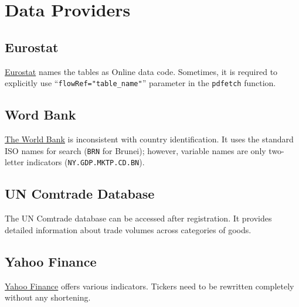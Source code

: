 \documentclass[10pt,a4paper]{article}
\begin{document}
\section*{Data Providers}
\subsection*{Eurostat}

\href{https://ec.europa.eu/eurostat/data/database}{\textcolor{NavyBlue}{Eurostat}} names the tables as Online data code. Sometimes, it is required to explicitly use \enquote{\texttt{flowRef="table\_name"}} parameter in the \texttt{pdfetch} function.

\begin{figure}[!htbp]\centering
\end{figure}

\subsection*{Word Bank}
\begin{figure}[!htbp]\centering
\end{figure}

\href{https://data.worldbank.org/}{\textcolor{NavyBlue}{The World Bank}} is inconsistent with country identification. It uses the standard ISO names for search (\texttt{BRN} for Brunei); however, variable names are only two-letter indicators (\texttt{NY.GDP.MKTP.CD.BN}).

\subsection*{UN Comtrade Database}
The UN Comtrade database can be accessed after registration. It provides detailed information about trade volumes across categories of goods. 


\subsection*{Yahoo Finance}
\href{https://finance.yahoo.com/}{\textcolor{NavyBlue}{Yahoo Finance}} offers various indicators. Tickers need to be rewritten completely without any shortening. 
\end{document}
